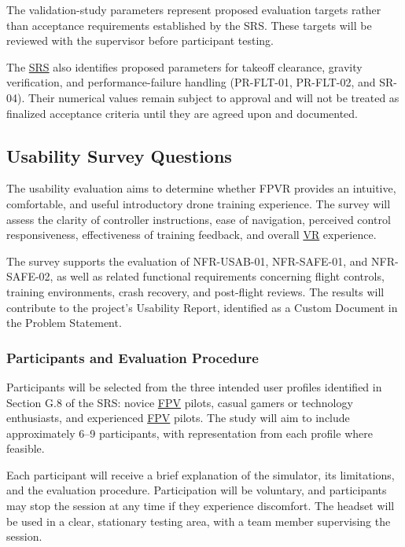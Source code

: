 \documentclass[12pt, titlepage]{article}
\begin{document}
The validation-study parameters represent proposed evaluation targets rather than acceptance requirements established by the SRS. These targets will be reviewed with the supervisor before participant testing.

The \hyperlink{abbr:SRS}{SRS} also identifies proposed parameters for takeoff clearance, gravity verification, and performance-failure handling (PR-FLT-01, PR-FLT-02, and SR-04). Their numerical values remain subject to approval and will not be treated as finalized acceptance criteria until they are agreed upon and documented.

\subsection{Usability Survey Questions}
\label{sec:usability-survey}

The usability evaluation aims to determine whether FPVR provides an intuitive, comfortable, and useful introductory drone training experience. The survey will assess the clarity of controller instructions, ease of navigation, perceived control responsiveness, effectiveness of training feedback, and overall \hyperlink{abbr:VR}{VR} experience.

The survey supports the evaluation of NFR-USAB-01, NFR-SAFE-01, and NFR-SAFE-02, as well as related functional requirements concerning flight controls, training environments, crash recovery, and post-flight reviews. The results will contribute to the project's Usability Report, identified as a Custom Document in the Problem Statement.

\subsubsection{Participants and Evaluation Procedure}

Participants will be selected from the three intended user profiles identified in Section G.8 of the SRS: novice \hyperlink{abbr:FPV}{FPV} pilots, casual gamers or technology enthusiasts, and experienced \hyperlink{abbr:FPV}{FPV} pilots. The study will aim to include approximately 6--9 participants, with representation from each profile where feasible.

Each participant will receive a brief explanation of the simulator, its limitations, and the evaluation procedure. Participation will be voluntary, and participants may stop the session at any time if they experience discomfort. The headset will be used in a clear, stationary testing area, with a team member supervising the session.
\end{document}

